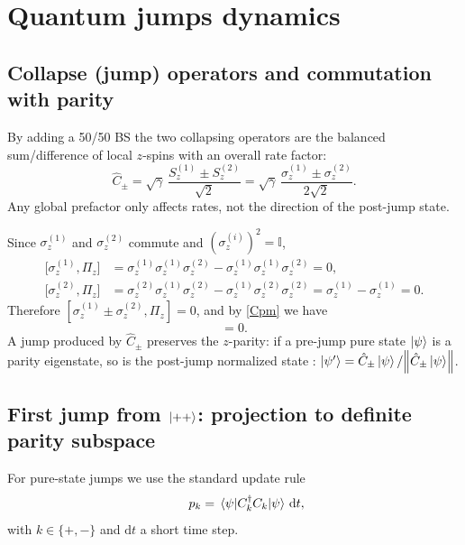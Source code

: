 \documentclass[12pt,a4paper]{article}
\begin{document}
	\section{Quantum jumps dynamics}
	
	\subsection{Collapse (jump) operators and commutation with parity}\label{sec:comm}
	By adding a 50/50 BS the two collapsing operators are the balanced sum/difference of local $z$-spins with an overall rate factor:
	\begin{equation}
		\hat{C}_\pm=\sqrt{\gamma}\,\frac{S_z^{(1)}\pm S_z^{(2)}}{\sqrt{2}}
		=\sqrt{\gamma}\,\frac{\sigma_z^{(1)}\pm \sigma_z^{(2)}}{2\sqrt{2}}.
		\label{Cpm}
	\end{equation}
	Any global prefactor only affects rates, not the direction of the post-jump state.
	
	Since \(\sigma_z^{(1)}\) and \(\sigma_z^{(2)}\) commute and \((\sigma_z^{(i)})^2=\mathbb{I}\),
	\begin{align}
		\big[\sigma_z^{(1)},\Pi_z\big]
		&=\sigma_z^{(1)}\sigma_z^{(1)}\sigma_z^{(2)}-\sigma_z^{(1)}\sigma_z^{(1)}\sigma_z^{(2)}=0,\\
		\big[\sigma_z^{(2)},\Pi_z\big]
		&=\sigma_z^{(2)}\sigma_z^{(1)}\sigma_z^{(2)}-\sigma_z^{(1)}\sigma_z^{(2)}\sigma_z^{(2)}
		=\sigma_z^{(1)}-\sigma_z^{(1)}=0.
	\end{align}
	Therefore \([\sigma_z^{(1)}\pm \sigma_z^{(2)},\Pi_z]=0\), and by \eqref{Cpm} we have
	\begin{equation}
		[\hat{C}_\pm,\Pi_z]=0.
	\end{equation}
	A jump produced by \(\hat{C}_\pm\) preserves the $z$-parity: if a pre-jump pure state \(\ket{\psi}\) is a parity eigenstate, so is the post-jump normalized state : 
	\(\ket{\psi'}=\hat{C}_\pm\ket{\psi}/\norm{\hat{C}_\pm\ket{\psi}}\).
	
	\subsection{First jump from \texorpdfstring{$\ket{++}$}{|++>}: projection to definite parity subspace}
	For pure-state jumps we use the standard update rule
	\begin{equation}
		\qquad p_k=\matrixel{\psi}{C_k^\dagger C_k}{\psi}\,\mathrm{d}t,
		\label{eq:jump_rule}
	\end{equation}
	with \(k\in\{+,-\}\) and \(\mathrm{d}t\) a short time step.
	
\end{document}
